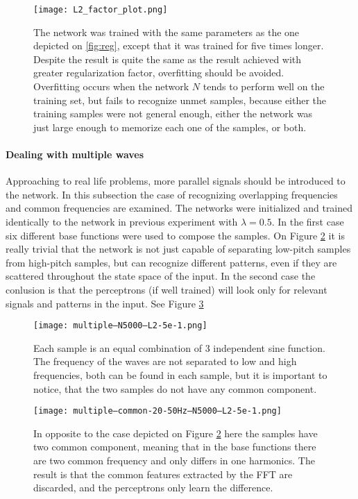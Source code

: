 \begin{figure}
	\centering
	\texttt{[image: L2\_factor\_plot.png]}
	\caption{The network was trained with the same parameters as the one depicted on \ref{fig:reg}, except that it was trained for five times longer. Despite the result is quite the same as the result achieved with greater regularization factor, overfitting should be avoided. Overfitting occurs when the network $N$ tends to perform well on the training set, but fails to recognize unmet samples, because either the training samples were not general enough, either the network was just large enough to memorize each one of the samples, or both. }
	
	\label{fig:overtrain}
\end{figure}


\paragraph{Dealing with multiple waves}
Approaching to real life problems, more parallel signals should be introduced to the network. In this subsection the case of recognizing overlapping frequencies and common frequencies are examined. The networks were initialized and trained identically to the network in previous experiment with $\lambda=0.5$. In the first case six different base functions were used to compose the samples. On Figure \ref{fig:multi} it is really trivial that the network is not just capable of separating low-pitch samples from high-pitch samples, but can recognize different patterns, even if they are scattered throughout the state space of the input. In the second case the conlusion is that the perceptrons (if well trained) will look only for relevant signals and patterns in the input.  See Figure \ref{fig:multi-common} \\

\begin{figure}
	\centering
	\texttt{[image: multiple---N5000---L2-5e-1.png]}
	\caption{Each sample is an equal combination of 3 independent sine function. The frequency of the waves are not separated to low and high frequencies, both can be found in each sample, but it is important to notice, that the two samples do not have any common component.}
	
	\label{fig:multi}
\end{figure}


\begin{figure}
	\centering
	\texttt{[image: multiple--common-20-50Hz--N5000---L2-5e-1.png]}
	\caption{In opposite to the case depicted on Figure \ref{fig:multi} here the samples have two common component, meaning that in the base functions there are two common frequency and only differs in one harmonics. The result is that the common features extracted by the FFT are discarded, and the perceptrons only learn the difference.}
	
	\label{fig:multi-common}
\end{figure}

